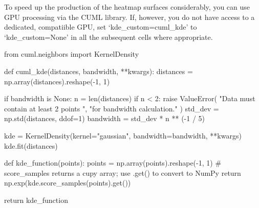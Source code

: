 \documentclass[
  11pt,
  letterpaper,
  DIV=11,
  numbers=noendperiod]{scrartcl}
\newenvironment{Shaded}{\begin{snugshade}}{\end{snugshade}}
\newcommand{\BuiltInTok}[1]{\textcolor[rgb]{0.00,0.23,0.31}{#1}}
\newcommand{\CommentTok}[1]{\textcolor[rgb]{0.37,0.37,0.37}{#1}}
\newcommand{\ControlFlowTok}[1]{\textcolor[rgb]{0.00,0.23,0.31}{#1}}
\newcommand{\DecValTok}[1]{\textcolor[rgb]{0.68,0.00,0.00}{#1}}
\newcommand{\ImportTok}[1]{\textcolor[rgb]{0.00,0.46,0.62}{#1}}
\newcommand{\KeywordTok}[1]{\textcolor[rgb]{0.00,0.23,0.31}{#1}}
\newcommand{\NormalTok}[1]{\textcolor[rgb]{0.00,0.23,0.31}{#1}}
\newcommand{\OperatorTok}[1]{\textcolor[rgb]{0.37,0.37,0.37}{#1}}
\newcommand{\PreprocessorTok}[1]{\textcolor[rgb]{0.68,0.00,0.00}{#1}}
\newcommand{\StringTok}[1]{\textcolor[rgb]{0.13,0.47,0.30}{#1}}
\newcommand{\VariableTok}[1]{\textcolor[rgb]{0.07,0.07,0.07}{#1}}
\begin{document}
To speed up the production of the heatmap surfaces considerably, you can
use GPU processing via the CUML library. If, however, you do not have
access to a dedicated, compatiible GPU, set `kde\_custom=cuml\_kde' to
`kde\_custom=None' in all the subsequent cells where appropriate.

\begin{Shaded}
\begin{Highlighting}[]
\ImportTok{from}\NormalTok{ cuml.neighbors }\ImportTok{import}\NormalTok{ KernelDensity}

\KeywordTok{def}\NormalTok{ cuml\_kde(distances, bandwidth, }\OperatorTok{**}\NormalTok{kwargs):}
\NormalTok{    distances }\OperatorTok{=}\NormalTok{ np.array(distances).reshape(}\OperatorTok{{-}}\DecValTok{1}\NormalTok{, }\DecValTok{1}\NormalTok{)}

    \ControlFlowTok{if}\NormalTok{ bandwidth }\KeywordTok{is} \VariableTok{None}\NormalTok{:}
\NormalTok{        n }\OperatorTok{=} \BuiltInTok{len}\NormalTok{(distances)}
        \ControlFlowTok{if}\NormalTok{ n }\OperatorTok{\textless{}} \DecValTok{2}\NormalTok{:}
            \ControlFlowTok{raise} \PreprocessorTok{ValueError}\NormalTok{(}
                \StringTok{"Data must contain at least 2 points "}\NormalTok{, }
                \StringTok{"for bandwidth calculation."}
\NormalTok{            )}
\NormalTok{        std\_dev }\OperatorTok{=}\NormalTok{ np.std(distances, ddof}\OperatorTok{=}\DecValTok{1}\NormalTok{)}
\NormalTok{        bandwidth }\OperatorTok{=}\NormalTok{ std\_dev }\OperatorTok{*}\NormalTok{ n }\OperatorTok{**}\NormalTok{ (}\OperatorTok{{-}}\DecValTok{1} \OperatorTok{/} \DecValTok{5}\NormalTok{)}
    
\NormalTok{    kde }\OperatorTok{=}\NormalTok{ KernelDensity(kernel}\OperatorTok{=}\StringTok{"gaussian"}\NormalTok{, bandwidth}\OperatorTok{=}\NormalTok{bandwidth, }\OperatorTok{**}\NormalTok{kwargs)}
\NormalTok{    kde.fit(distances)}

    \KeywordTok{def}\NormalTok{ kde\_function(points):}
\NormalTok{        points }\OperatorTok{=}\NormalTok{ np.array(points).reshape(}\OperatorTok{{-}}\DecValTok{1}\NormalTok{, }\DecValTok{1}\NormalTok{)}
        \CommentTok{\# score\_samples returns a cupy array; use .get() to convert to NumPy}
        \ControlFlowTok{return}\NormalTok{ np.exp(kde.score\_samples(points).get())}
    
    \ControlFlowTok{return}\NormalTok{ kde\_function}
\end{Highlighting}
\end{Shaded}
\end{document}
